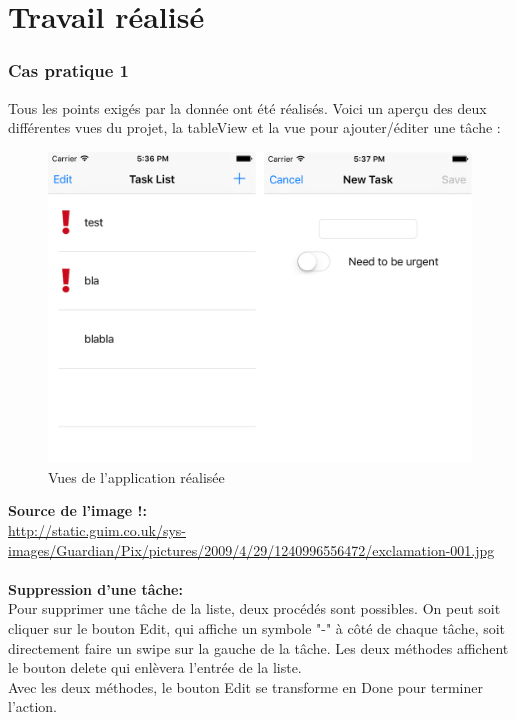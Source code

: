 \pagebreak
\section{Travail réalisé}

\subsubsection{Cas pratique 1}
Tous les points exigés par la donnée ont été réalisés. Voici un aperçu des deux différentes vues du projet, la tableView et la vue pour ajouter/éditer une tâche :

\begin{figure}[H]
	\begin{center}
		\includegraphics[width=14cm]{img/cas1_0.png}
		\caption{Vues de l'application réalisée}
		\label{vues}
	\end{center}
\end{figure}
\textbf{Source de l'image !:\\}
\url{http://static.guim.co.uk/sys-images/Guardian/Pix/pictures/2009/4/29/1240996556472/exclamation-001.jpg}\\\\

\textbf{Suppression d'une tâche:}\\
Pour supprimer une tâche de la liste, deux procédés sont possibles. On peut soit cliquer sur le bouton Edit, qui affiche un symbole "-" à côté de chaque tâche, soit directement faire un swipe sur la gauche de la tâche. Les deux méthodes affichent le bouton delete qui enlèvera l'entrée de la liste.\\
Avec les deux méthodes, le bouton Edit se transforme en Done pour terminer l'action.

